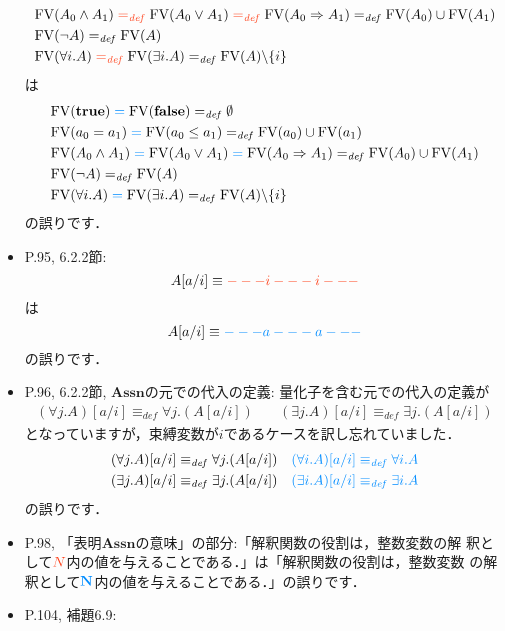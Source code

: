 \documentclass[12pt,titlepage,twoside,openright,dvipdfmx]{jsbook}
\newcommand\old[1]{%
  \textcolor[rgb]{1.0,0.25,0.1}{#1}%
  }
\newcommand\new[1]{%
  \textcolor[rgb]{0,0.55,1.0}{#1}%
  }
\theoremstyle{definition}
\begin{document}
\begin{itemize}
\begin{align*}
    & \FV{A_0 \wedge A_1} \old{{}=_{\mathit{def}}{}} \FV{A_0 \vee A_1} \old{{}=_{\mathit{def}}{}} \FV{A_0 \Rightarrow A_1} =_{\mathit{def}} \FV{A_0} \cup \FV{A_1} \\
    & \FV{\neg{A}} =_{\mathit{def}} \FV{A} \\
    & \FV{\forall{i}.A} \old{{}=_{\mathit{def}}{}} \FV{\exists{i}.A} =_{\mathit{def}} \FV{A} \backslash \{i\}
  \end{align*}
  は
  \begin{align*}
    & \FV{\Ttrue} \new{{}={}} \FV{\Tfalse} =_{\mathit{def}} \emptyset \\
    & \FV{a_0 = a_1} \new{{}={}} \FV{a_0 \leq a_1} =_{\mathit{def}} \FV{a_0} \cup \FV{a_1} \\
    & \FV{A_0 \wedge A_1} \new{{}={}} \FV{A_0 \vee A_1} \new{{}={}} \FV{A_0 \Rightarrow A_1} =_{\mathit{def}} \FV{A_0} \cup \FV{A_1} \\
    & \FV{\neg{A}} =_{\mathit{def}} \FV{A} \\
    & \FV{\forall{i}.A} \new{{}={}} \FV{\exists{i}.A} =_{\mathit{def}} \FV{A} \backslash \{i\}
  \end{align*}
  の誤りです．
\item P.95, 6.2.2節:
  \[
    A[a/i] \equiv \old{- - - i - - - i - --}
  \]
  は
  \[
    A[a/i] \equiv \new{- - - a - - - a - --}
  \]
  の誤りです．
\item P.96, 6.2.2節, $\mathbf{Assn}$の元での代入の定義:
  量化子を含む元での代入の定義が
  \begin{align*}
    (\forall{j}.A)[a/i] \equiv_{\mathit{def}} \forall{j}.(A[a/i]) \quad & (\exists{j}.A)[a/i] \equiv_{\mathit{def}} \exists{j}.(A[a/i])
  \end{align*}
  となっていますが，束縛変数が$i$であるケースを訳し忘れていました．
  \begin{align*}
    (\forall{j}.A)[a/i] \equiv_{\mathit{def}} \forall{j}.(A[a/i]) \quad & \new{(\forall{i}.A)[a/i] \equiv_{\mathit{def}} \forall{i}.A}\\
    (\exists{j}.A)[a/i] \equiv_{\mathit{def}} \exists{j}.(A[a/i]) \quad & \new{(\exists{i}.A)[a/i] \equiv_{\mathit{def}} \exists{i}.A}
  \end{align*}
  の誤りです．
\item P.98,
  「表明$\mathbf{Assn}$の意味」の部分:「解釈関数の役割は，整数変数の解
  釈として$\old{N}$内の値を与えることである．」は「解釈関数の役割は，整数変数
  の解釈として$\new{\mathbf{N}}$内の値を与えることである．」の誤りです．
\item P.104, 補題6.9:

\end{itemize}
\end{document}
